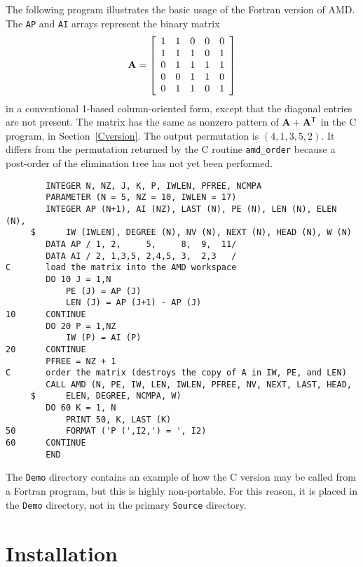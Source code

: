 \documentclass[11pt]{article}
\newcommand{\m}[1]{{\bf{#1}}}       %
\newcommand{\tr}{^{\sf T}}          %
\begin{document}
The following program illustrates the basic usage of the Fortran version of AMD.
The {\tt AP} and {\tt AI} arrays represent the binary matrix
\[
\m{A} = \left[
\begin{array}{rrrrr}
 1 &  1 &  0 &  0 &  0 \\
 1 &  1 &  1 &  0 &  1 \\
 0 &  1 &  1 &  1 &  1 \\
 0 &  0 &  1 &  1 &  0 \\
 0 &  1 &  1 &  0 &  1 \\
\end{array}
\right]
\]
in a conventional 1-based column-oriented form,
except that the diagonal entries are not present.
The matrix has the same as nonzero pattern of $\m{A}+\m{A}\tr$ in the C
program, in Section~\ref{Cversion}.
The output permutation is $(4, 1, 3, 5, 2)$.
It differs from the permutation returned by the C routine {\tt amd\_order}
because a post-order of the elimination tree has not yet been performed.

{\footnotesize
\begin{verbatim}
        INTEGER N, NZ, J, K, P, IWLEN, PFREE, NCMPA
        PARAMETER (N = 5, NZ = 10, IWLEN = 17)
        INTEGER AP (N+1), AI (NZ), LAST (N), PE (N), LEN (N), ELEN (N),
     $      IW (IWLEN), DEGREE (N), NV (N), NEXT (N), HEAD (N), W (N)
        DATA AP / 1, 2,     5,     8,  9,  11/
        DATA AI / 2, 1,3,5, 2,4,5, 3,  2,3   /
C       load the matrix into the AMD workspace
        DO 10 J = 1,N
            PE (J) = AP (J)
            LEN (J) = AP (J+1) - AP (J)
10      CONTINUE
        DO 20 P = 1,NZ
            IW (P) = AI (P)
20      CONTINUE
        PFREE = NZ + 1
C       order the matrix (destroys the copy of A in IW, PE, and LEN)
        CALL AMD (N, PE, IW, LEN, IWLEN, PFREE, NV, NEXT, LAST, HEAD,
     $      ELEN, DEGREE, NCMPA, W)
        DO 60 K = 1, N
            PRINT 50, K, LAST (K)
50          FORMAT ('P (',I2,') = ', I2)
60      CONTINUE
        END
\end{verbatim}
}

The {\tt Demo} directory contains an example of how the C version
may be called from a Fortran program, but this is highly non-portable.
For this reason, it is placed in the {\tt Demo} directory, not in the
primary {\tt Source} directory.

\section{Installation}
\label{Install}
\end{document}
